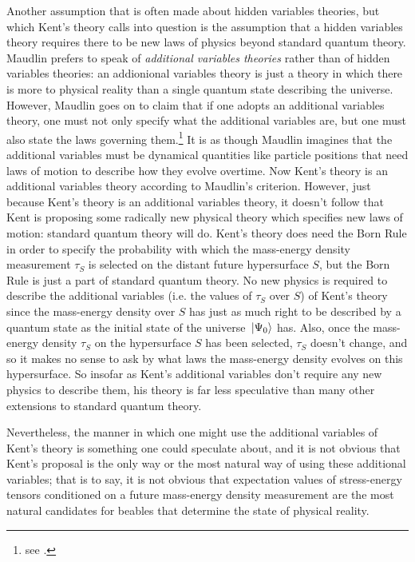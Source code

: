 Another assumption that is often made about hidden variables theories, but which Kent's theory calls into question is the assumption that a hidden variables theory requires there to be new laws of physics beyond standard quantum theory.  Maudlin prefers to speak of \emph{additional variables theories} rather than of hidden variables theories: an addionional variables theory is just a theory in which there is more to physical reality than a single quantum state describing the universe. However, Maudlin goes on to claim that if one adopts  an additional variables theory, one must not only specify what the additional variables are, but one must also state the laws governing them.\footnote{see \cite[9]{MAUDLINT1995Tmp}. } It is as though Maudlin  imagines that the additional variables must be dynamical quantities like particle positions that need laws of motion to describe how they evolve overtime. Now Kent's theory is an additional variables theory according to Maudlin's criterion. However, just because Kent's theory is an additional variables theory, it doesn't follow that Kent is proposing some radically new physical theory which specifies new laws of motion: standard quantum theory will do. Kent's theory does need the Born Rule in order to specify the probability with which the mass-energy density measurement $\tau_S$ is selected on the distant future hypersurface $S$, but the Born Rule is just a part of standard quantum theory. No new physics is required to describe the additional variables (i.e. the values of $\tau_S$ over $S$)  of Kent's theory since the mass-energy density over $S$ has just as much right to be described by a quantum state as the initial state  of the universe $\ket*{\Psi_0}$ has. Also, once the mass-energy density $\tau_S$ on the hypersurface $S$ has been selected, $\tau_S$ doesn't change, and so it makes no sense to ask by what laws the mass-energy density evolves on this hypersurface. So insofar as Kent's additional variables don't require any new physics to describe them, his theory is far less speculative than many other extensions to standard quantum theory. 

Nevertheless, the manner in which one might use the additional variables of Kent's theory is something one could speculate about, and it is not obvious that Kent's proposal is the only way or the most natural way of using these additional variables; that is to say, it is not obvious that expectation values of stress-energy tensors conditioned on a future mass-energy density measurement are the most natural candidates for beables that determine the state of physical reality.  


